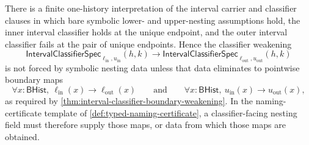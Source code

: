 \begin{proposition}
\label{prop:interval-nesting-requires-boundary-eliminators}
There is a finite one-history interpretation of the interval carrier and classifier clauses in which bare symbolic lower- and upper-nesting assumptions hold, the inner interval classifier holds at the unique endpoint, and the outer interval classifier fails at the pair of unique endpoints. Hence the classifier weakening
$$
\mathsf{IntervalClassifierSpec}_{\ell_{\mathrm{in}},u_{\mathrm{in}}}(h,k)\to
\mathsf{IntervalClassifierSpec}_{\ell_{\mathrm{out}},u_{\mathrm{out}}}(h,k)
$$
is not forced by symbolic nesting data unless that data eliminates to pointwise boundary maps
$$
\forall x:\mathsf{BHist},\ \ell_{\mathrm{in}}(x)\to\ell_{\mathrm{out}}(x)
\qquad\text{and}\qquad
\forall x:\mathsf{BHist},\ u_{\mathrm{in}}(x)\to u_{\mathrm{out}}(x),
$$
as required by \autoref{thm:interval-classifier-boundary-weakening}. In the naming-certificate template of \autoref{def:typed-naming-certificate}, a classifier-facing nesting field must therefore supply those maps, or data from which those maps are obtained.
\end{proposition}
